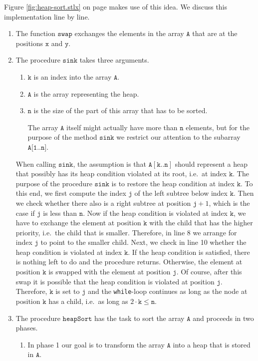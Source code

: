 Figure \ref{fig:heap-sort.stlx} on page \pageref{fig:basic-heapsort.stlx} makes use of this idea.
We discuss this implementation line by line.
\begin{enumerate}
\item The function $\texttt{swap}$ exchanges the elements in the array $\texttt{A}$ that are at the
      positions $\texttt{x}$ and $\texttt{y}$.
\item The procedure $\texttt{sink}$ takes three arguments.
      \begin{enumerate}
      \item $\texttt{k}$ is an index into the array $\texttt{A}$.
      \item $\texttt{A}$ is the array representing the heap.
      \item $\texttt{n}$ is the size of the part of this array that has to be sorted.  

            The array $\texttt{A}$ itself might actually have more than $\texttt{n}$ elements, but for the
            purpose of the method $\texttt{sink}$ we restrict our attention to the subarray
            $\texttt{A[1..n]}$. 
      \end{enumerate}
      When calling $\texttt{sink}$, the assumption is that $\texttt{A}[\texttt{k..n}]$ should represent a heap 
      that possibly has its heap condition violated at its root, i.e.~at index $\texttt{k}$.  The
      purpose of the procedure $\texttt{sink}$ is to restore the heap condition at index $\texttt{k}$.
      To this end, we first compute the index $\texttt{j}$ of the left subtree below index $\texttt{k}$.
      Then we check whether there also is a right subtree at position $\texttt{j}+1$, which is the
      case if $\texttt{j}$ is less than $\texttt{n}$.  Now if the heap condition is violated at index
      $\texttt{k}$, we have to exchange the element at  position $\texttt{k}$ with the child that has
      the higher priority, i.e.~the child that is smaller. Therefore, in line 8 we arrange for index
      $\texttt{j}$ to point to the smaller child.  Next, we check in line 10 whether the heap
      condition is violated at index $\texttt{k}$.  If the heap condition is satisfied, there is
      nothing left to do and the procedure returns.  Otherwise, the element at position $\texttt{k}$ is swapped with
      the element at position $\texttt{j}$.  Of course, after this swap it is possible that the heap condition is
      violated at position $\texttt{j}$.  Therefore,  $\texttt{k}$ is set to $\texttt{j}$ and the \texttt{while}-loop continues
      as long as the node at position $\texttt{k}$ has a child, i.e.~as long as 
      $2 \cdot \texttt{k}\leq \texttt{n}$.
\item The procedure $\texttt{heapSort}$ has the task to sort the array $\texttt{A}$ and proceeds in two phases.
      \begin{enumerate}
      \item In phase 1 our goal is to transform the array $\texttt{A}$ into a heap that is stored in $\texttt{A}$.


\end{enumerate}
\end{enumerate}
